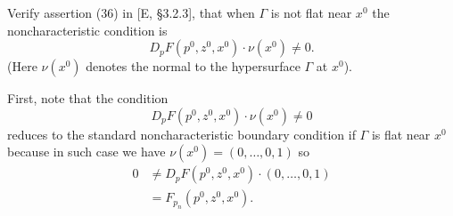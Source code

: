 \begin{problem}
  Verify assertion (36) in [E, \S 3.2.3], that when \(\Gamma\) is not flat
  near \(x^0\) the noncharacteristic condition is
  \[
    D_pF(p^0,z^0,x^0)\cdot \nu(x^0)\neq 0.
  \]
  (Here \(\nu(x^0)\) denotes the normal to the hypersurface \(\Gamma\) at
  \(x^0\)).
\end{problem}
\begin{solution}
  First, note that the condition
  \begin{equation}
    \label{eq:2-1}
    D_pF(p^0,z^0,x^0)\cdot \nu(x^0)\neq 0
  \end{equation}
  reduces to the standard noncharacteristic boundary condition if
  \(\Gamma\) is flat near \(x^0\) because in such case we have
  \(\nu(x^0)=(0,\dotsc,0,1)\) so
  \begin{align*}
    0&\neq D_pF(p^0,z^0,x^0)\cdot (0,\dotsc,0,1)\\
     &=F_{p_n}(p^0,z^0,x^0).
  \end{align*}


\end{solution}
